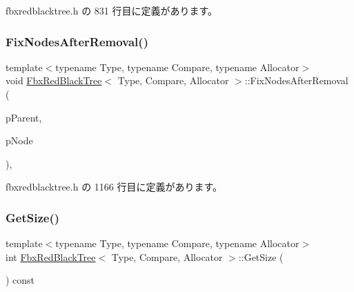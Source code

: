  fbxredblacktree.\+h の 831 行目に定義があります。

\mbox{\label{class_fbx_red_black_tree_a3324d8304143f4d05160eab2aee1c6fa}} 
\subsubsection{\texorpdfstring{Fix\+Nodes\+After\+Removal()}{FixNodesAfterRemoval()}}
{\footnotesize\ttfamily template$<$typename Type, typename Compare, typename Allocator$>$ \\
void \hyperlink{class_fbx_red_black_tree}{Fbx\+Red\+Black\+Tree}$<$ Type, Compare, Allocator $>$\+::Fix\+Nodes\+After\+Removal (\begin{DoxyParamCaption}\item[{\hyperlink{class_fbx_red_black_tree_1_1_record_type}{Record\+Type} $\ast$}]{p\+Parent,  }\item[{\hyperlink{class_fbx_red_black_tree_1_1_record_type}{Record\+Type} $\ast$}]{p\+Node }\end{DoxyParamCaption})\hspace{0.3cm}{\ttfamily [inline]}, {\ttfamily [protected]}}



 fbxredblacktree.\+h の 1166 行目に定義があります。

\mbox{\label{class_fbx_red_black_tree_a99b4a611074bfd7b5a5165ca9cd9b14b}} 
\subsubsection{\texorpdfstring{Get\+Size()}{GetSize()}}
{\footnotesize\ttfamily template$<$typename Type, typename Compare, typename Allocator$>$ \\
int \hyperlink{class_fbx_red_black_tree}{Fbx\+Red\+Black\+Tree}$<$ Type, Compare, Allocator $>$\+::Get\+Size (\begin{DoxyParamCaption}{ }\end{DoxyParamCaption}) const\hspace{0.3cm}{\ttfamily [inline]}}

